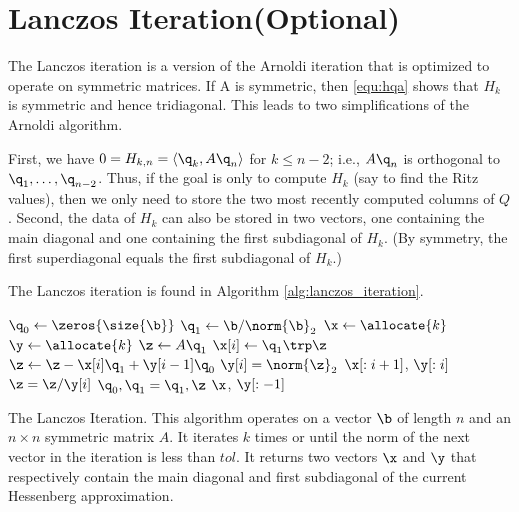 \section*{Lanczos Iteration(Optional)}
The Lanczos iteration is a version of the Arnoldi iteration that is optimized to operate on symmetric matrices.
If A is symmetric, then \eqref{equ:hqa} shows that $H_k$ is symmetric and hence tridiagonal.
This leads to two simplifications of the Arnoldi algorithm.

First, we have $0=H_{k, n}=\langle \q_k, A\q_n \rangle$ for $k \leq n-2$; i.e., $A\q_n$ is orthogonal to $\q_1, \ldots, \q_{n-2}$. 
Thus, if the goal is only to compute $H_k$ (say to find the Ritz values), then we only need to store the two most recently computed columns of $Q$.
Second, the data of $H_k$ can also be stored in two vectors, one containing the main diagonal and one containing the first subdiagonal of $H_k$. 
(By symmetry, the first superdiagonal equals the first subdiagonal of $H_k$.)

The Lanczos iteration is found in Algorithm \ref{alg:lanczos_iteration}.

\begin{algorithm}
\begin{algorithmic}[1]
	\State $\q_0 \gets \zeros{\size{\b}}$								
	\State $\q_1 \gets \b/\norm{\b}_2$
	\State $\x \gets \allocate{k}$
	\State $\y \gets \allocate{k}$
										
		\State $\z \gets A\q_1$					
		\State $\x[i] \gets \q_1\trp \z$				
		\State $\z \gets \z - \x[i] \q_1 + \y[i-1] \q_0$				
		\State $\y[i] = \norm{\z}_2$						
										
			\State {} $\x[: i+1]$, $\y[: i]$
		\EndIf
		\State $\z = \z/ \y[i]$
		\State $\q_0, \q_1 = \q_1, \z$						
	\EndFor
	\State {} $\x$, $\y[: -1]$
\EndProcedure
\end{algorithmic}
\caption{The Lanczos Iteration. This algorithm operates on a vector $\b$ of length $n$ and an $n \times n$ symmetric matrix $A$. It iterates $k$ times or until the norm of the next vector in the iteration is less than $tol$. It returns two vectors $\x$ and $\y$ that respectively contain the main diagonal and first subdiagonal of the current Hessenberg approximation.}
\label{alg:lanczos_iteration}
\end{algorithm}

